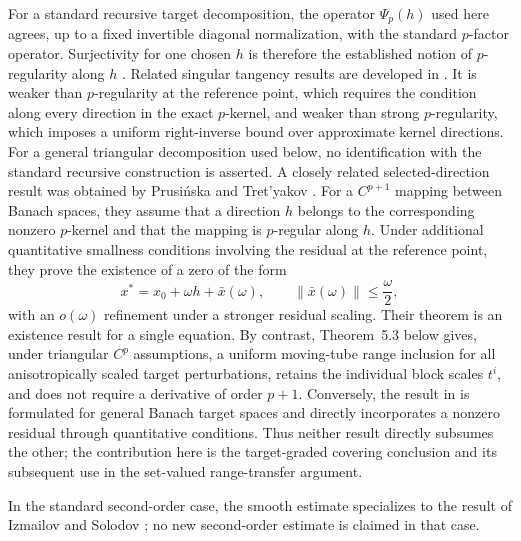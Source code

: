 \documentclass[11pt]{amsart}
\theoremstyle{definition}
\theoremstyle{remark}
\begin{document}
	For a standard recursive target decomposition, the operator
	$\Psi_p(h)$ used here agrees, up to a fixed invertible diagonal
	normalization, with the standard $p$-factor operator. Surjectivity for one
	chosen $h$ is therefore the established notion of $p$-regularity along
	$h$ \cite{BrezhnevaTretyakovMarsden,TretyakovMarsden,
		BednarczukEtAlSurvey}. Related singular tangency results are developed in
	\cite{BednarczukTretyakovNonlinearity,PrusinskaTretyakovTangent}. It is
	weaker than $p$-regularity at the reference
	point, which requires the condition along every direction in the exact
	$p$-kernel, and weaker than strong $p$-regularity, which imposes a uniform
	right-inverse bound over approximate kernel directions. For a general
	triangular decomposition used below, no identification with the standard
	recursive construction is asserted.
	A closely related selected-direction result was obtained by Prusińska and Tret'yakov \cite[Theorem~3]{PrusinskaTretyakov2011}. For a $C^{p+1}$ mapping between Banach spaces, they assume that a direction $h$ belongs to the corresponding nonzero $p$-kernel and that the mapping is $p$-regular along $h$. Under additional quantitative smallness conditions involving the residual at the reference point, they prove the existence of a zero of the form
	$$
	x^*=x_0+\omega h+\bar x(\omega),
	\qquad
	\|\bar x(\omega)\|\leq \frac{\omega}{2},
	$$
	with an $o(\omega)$ refinement under a stronger residual scaling. Their theorem is an existence result for a single equation. By contrast, Theorem~5.3 below gives, under triangular $C^p$ assumptions, a uniform moving-tube range inclusion for all anisotropically scaled target perturbations, retains the individual block scales $t^i$, and does not require a derivative of order $p+1$. Conversely, the result in \cite{PrusinskaTretyakov2011} is formulated for general Banach target spaces and directly incorporates a nonzero residual through quantitative conditions. Thus neither result directly subsumes the other; the contribution here is the target-graded covering conclusion and its subsequent use in the set-valued range-transfer argument.
	
	In the standard second-order case,
	the smooth estimate specializes to the result of Izmailov and Solodov
	\cite[Theorem~4.1]{IzmailovSolodov}; no new second-order estimate is
	claimed in that case.
	
\end{document}
